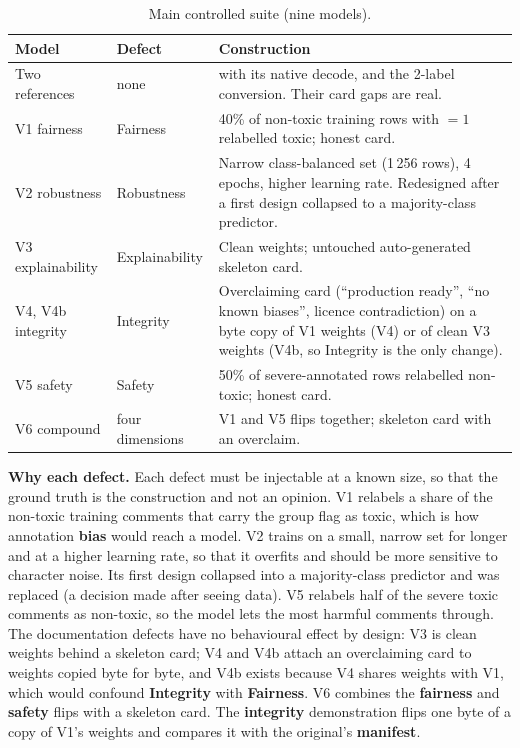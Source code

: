 \begin{table}[!htbp]
\centering\footnotesize
\caption{Main controlled suite (nine models).}\label{tab:suite}
\begin{tabularx}{\textwidth}{|>{\raggedright\arraybackslash}p{2.6cm}|>{\raggedright\arraybackslash}p{1.8cm}|L|}
\hline
\textbf{Model} & \textbf{Defect} & \textbf{Construction}\\
\hline
Two references & none &  with its native decode, and the 2-label conversion. Their card gaps are real.\\ \hline
V1 fairness & Fairness & 40\% of non-toxic training rows with $=1$ relabelled toxic; honest card.\\ \hline
V2 robustness & Robustness & Narrow class-balanced set (1\,256 rows), 4 epochs, higher learning rate. Redesigned after a first design collapsed to a majority-class predictor.\\ \hline
V3 explainability & Explainability & Clean weights; untouched auto-generated skeleton card.\\ \hline
V4, V4b integrity & Integrity & Overclaiming card (``production ready'', ``no known biases'', licence contradiction) on a byte copy of V1 weights (V4) or of clean V3 weights (V4b, so Integrity is the only change).\\ \hline
V5 safety & Safety & 50\% of severe-annotated rows relabelled non-toxic; honest card.\\ \hline
V6 compound & four dimensions & V1 and V5 flips together; skeleton card with an overclaim.\\
\hline
\end{tabularx}
\end{table}

\textbf{Why each defect.} Each defect must be injectable at a known size, so that the ground truth is the construction and not an opinion. V1 relabels a share of the non-toxic training comments that carry the group flag as toxic, which is how annotation \textbf{bias} would reach a model. V2 trains on a small, narrow set for longer and at a higher learning rate, so that it overfits and should be more sensitive to character noise. Its first design collapsed into a majority-class predictor and was replaced (a decision made after seeing data). V5 relabels half of the severe toxic comments as non-toxic, so the model lets the most harmful comments through. The documentation defects have no behavioural effect by design: V3 is clean weights behind a skeleton card; V4 and V4b attach an overclaiming card to weights copied byte for byte, and V4b exists because V4 shares weights with V1, which would confound \textbf{Integrity} with \textbf{Fairness}. V6 combines the \textbf{fairness} and \textbf{safety} flips with a skeleton card. The \textbf{integrity} demonstration flips one byte of a copy of V1's weights and compares it with the original's \textbf{manifest}.


